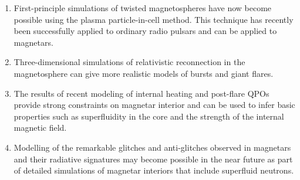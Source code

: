 \begin{issues}
\begin{enumerate}
\item First-principle simulations of twisted magnetospheres have now become possible using the plasma particle-in-cell
method. This technique has recently been successfully applied to ordinary radio pulsars and can be applied to magnetars.

\item Three-dimensional simulations of relativistic reconnection in the magnetosphere can give more realistic models of bursts and giant flares.

\item The results of recent modeling of internal heating and post-flare QPOs provide strong constraints on magnetar interior and can be used to infer basic properties such as superfluidity in the core and the strength of the internal magnetic field.

\item 
Modelling of the remarkable glitches and anti-glitches observed in magnetars and their 
radiative signatures may become possible in the near future as part of detailed 
simulations of magnetar interiors that include superfluid neutrons.


\end{enumerate}
\end{issues}

